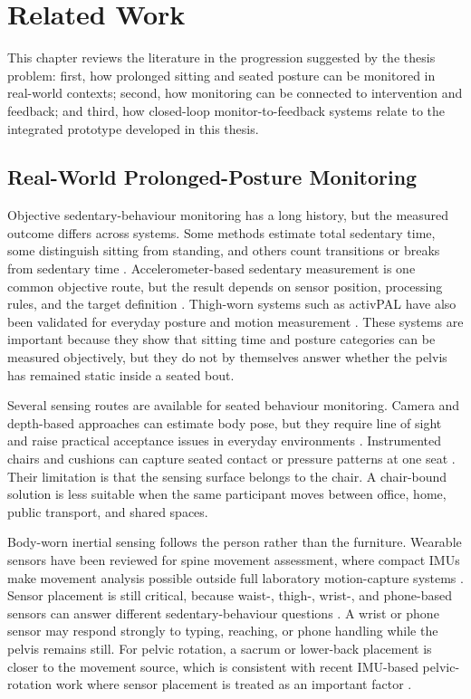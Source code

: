 \chapter{Related Work}\label{ch:related_work}

This chapter reviews the literature in the progression suggested by the thesis problem: first, how prolonged sitting and seated posture can be monitored in real-world contexts; second, how monitoring can be connected to intervention and feedback; and third, how closed-loop monitor-to-feedback systems relate to the integrated prototype developed in this thesis.

\section{Real-World Prolonged-Posture Monitoring}

Objective sedentary-behaviour monitoring has a long history, but the measured outcome differs across systems. Some methods estimate total sedentary time, some distinguish sitting from standing, and others count transitions or breaks from sedentary time \cite{chastin2010objective_sedentary}. Accelerometer-based sedentary measurement is one common objective route, but the result depends on sensor position, processing rules, and the target definition \cite{byrom2016objective_sedentary_accelerometers}. Thigh-worn systems such as activPAL have also been validated for everyday posture and motion measurement \cite{grant2006activpal_validation}. These systems are important because they show that sitting time and posture categories can be measured objectively, but they do not by themselves answer whether the pelvis has remained static inside a seated bout.

Several sensing routes are available for seated behaviour monitoring. Camera and depth-based approaches can estimate body pose, but they require line of sight and raise practical acceptance issues in everyday environments \cite{lan2023vision}. Instrumented chairs and cushions can capture seated contact or pressure patterns at one seat \cite{tan2001sensing}. Their limitation is that the sensing surface belongs to the chair. A chair-bound solution is less suitable when the same participant moves between office, home, public transport, and shared spaces.

Body-worn inertial sensing follows the person rather than the furniture. Wearable sensors have been reviewed for spine movement assessment, where compact IMUs make movement analysis possible outside full laboratory motion-capture systems \cite{papi2017wearable}. Sensor placement is still critical, because waist-, thigh-, wrist-, and phone-based sensors can answer different sedentary-behaviour questions \cite{kalisch2022waist_thigh_sedentary}. A wrist or phone sensor may respond strongly to typing, reaching, or phone handling while the pelvis remains still. For pelvic rotation, a sacrum or lower-back placement is closer to the movement source, which is consistent with recent IMU-based pelvic-rotation work where sensor placement is treated as an important factor \cite{liao2026imu_pelvic_rotation}.


